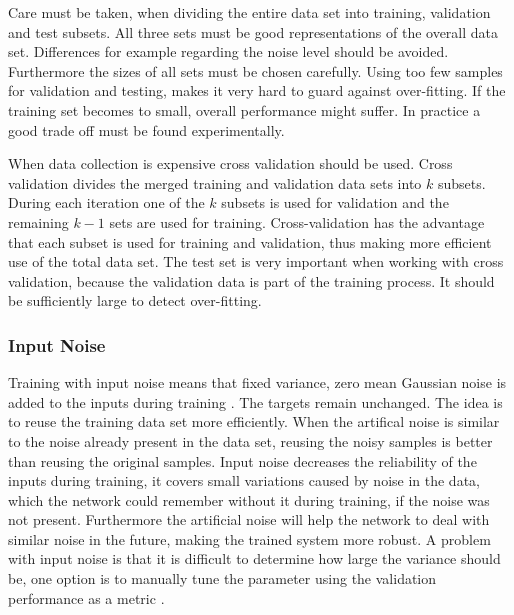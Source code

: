 Care must be taken, when dividing the entire data set into training, validation and test subsets. All three sets must be good representations of the overall data set. Differences for example regarding the noise level should be avoided. Furthermore the sizes of all sets must be chosen carefully. Using too few samples for validation and testing, makes it very hard to guard against over-fitting. If the training set becomes to small, overall performance might suffer. In practice a good trade off must be found experimentally.

When data collection is expensive cross validation should be used. Cross validation divides the merged training and validation data sets into $k$ subsets. During each iteration one of the $k$ subsets is used for validation and the remaining $k-1$ sets are used for training. Cross-validation has the advantage that each subset is used for training and validation, thus making more efficient use of the total data set. The test set is very important when working with cross validation, because the validation data is part of the training process. It should be sufficiently large to detect over-fitting.


\subsubsection{Input Noise}
Training with input noise means that fixed variance, zero mean Gaussian noise is added to the inputs during training \cite[page 32]{Graves2012}. The targets remain unchanged. The idea is to reuse the training data set more efficiently. When the artifical noise is similar to the noise already present in the data set, reusing the noisy samples is better than reusing the original samples. Input noise decreases the reliability of the inputs during training, it covers small variations caused by noise in the data, which the network could remember without it during training, if the noise was not present. Furthermore the artificial noise will help the network to deal with similar noise in the future, making the trained system more robust.
A problem with input noise is that it is difficult to determine how large the variance should be, one option is to manually tune the parameter using the validation performance as a metric \cite[page 32]{Graves2012}.


